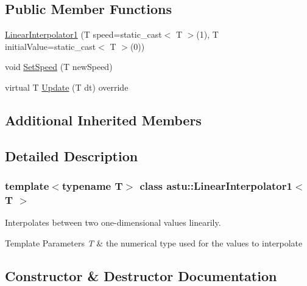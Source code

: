 \subsection*{Public Member Functions}
\begin{DoxyCompactItemize}
\item 
\hyperlink{classastu_1_1LinearInterpolator1_a378aee9822733ace3405c81c7062a50a}{Linear\+Interpolator1} (T speed=static\+\_\+cast$<$ T $>$(1), T initial\+Value=static\+\_\+cast$<$ T $>$(0))
\item 
void \hyperlink{classastu_1_1LinearInterpolator1_ac4f516f5c77e3e09c32ef92cb1031366}{Set\+Speed} (T new\+Speed)
\item 
virtual T \hyperlink{classastu_1_1LinearInterpolator1_a87cd49a1e029c8a4e7ca116c4dfae900}{Update} (T dt) override
\end{DoxyCompactItemize}
\subsection*{Additional Inherited Members}


\subsection{Detailed Description}
\subsubsection*{template$<$typename T$>$\newline
class astu\+::\+Linear\+Interpolator1$<$ T $>$}

Interpolates between two one-\/dimensional values linearily.


\begin{DoxyTemplParams}{Template Parameters}
{\em T} & the numerical type used for the values to interpolate \\
\hline
\end{DoxyTemplParams}


\subsection{Constructor \& Destructor Documentation}
\mbox{\label{classastu_1_1LinearInterpolator1_a378aee9822733ace3405c81c7062a50a}} 

